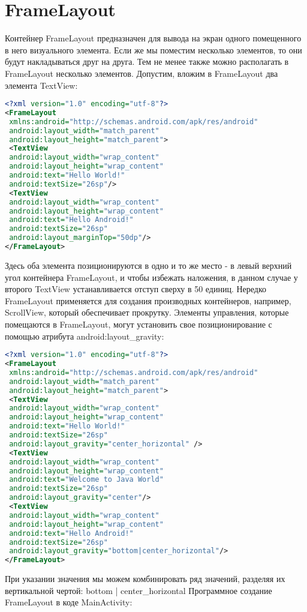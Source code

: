 \section{FrameLayout}
Контейнер FrameLayout предназначен для вывода на экран одного
помещенного в него визуального элемента. Если же мы поместим несколько
элементов, то они будут накладываться друг на друга. Тем не менее также
можно располагать в FrameLayout несколько элементов.
Допустим, вложим в FrameLayout два элемента TextView:
\begin{lstlisting}[language=xml, caption=\leftline{xml}, label=lst:FrameLayout]
<?xml version="1.0" encoding="utf-8"?>
<FrameLayout
 xmlns:android="http://schemas.android.com/apk/res/android"
 android:layout_width="match_parent"
 android:layout_height="match_parent">
 <TextView
 android:layout_width="wrap_content"
 android:layout_height="wrap_content"
 android:text="Hello World!"
 android:textSize="26sp"/>
 <TextView
 android:layout_width="wrap_content"
 android:layout_height="wrap_content"
 android:text="Hello Android!"
 android:textSize="26sp"
 android:layout_marginTop="50dp"/>
</FrameLayout>
\end{lstlisting}
Здесь оба элемента позиционируются в одно и то же место - в левый верхний
угол контейнера FrameLayout, и чтобы избежать наложения, в данном случае
у второго TextView устанавливается отступ сверху в 50 единиц.
Нередко FrameLayout применяется для создания производных контейнеров,
например, ScrollView, который обеспечивает прокрутку.
Элементы управления, которые помещаются в FrameLayout, могут
установить свое позиционирование с помощью атрибута
android:layout\_gravity:
\begin{lstlisting}[language=xml, caption=\leftline{xml}, label=lst:layoutgravity]
<?xml version="1.0" encoding="utf-8"?>
<FrameLayout
 xmlns:android="http://schemas.android.com/apk/res/android"
 android:layout_width="match_parent"
 android:layout_height="match_parent">
 <TextView
 android:layout_width="wrap_content"
 android:layout_height="wrap_content"
 android:text="Hello World!"
 android:textSize="26sp"
 android:layout_gravity="center_horizontal" />
 <TextView
 android:layout_width="wrap_content"
 android:layout_height="wrap_content"
 android:text="Welcome to Java World"
 android:textSize="26sp"
 android:layout_gravity="center"/>
 <TextView
 android:layout_width="wrap_content"
 android:layout_height="wrap_content"
 android:text="Hello Android!"
 android:textSize="26sp"
 android:layout_gravity="bottom|center_horizontal"/>
</FrameLayout>
\end{lstlisting}
При указании значения мы можем комбинировать ряд значений, разделяя их
вертикальной чертой: bottom | center\_horizontal
Программное создание FrameLayout в коде MainActivity:

